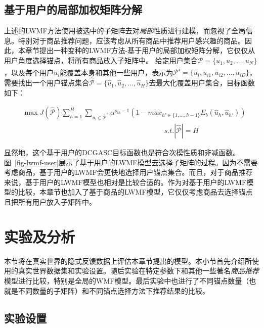 \subsection{基于用户的局部加权矩阵分解}
上述的LWMF方法使用被选中的子矩阵去对\textit{局部}性质进行建模，而忽视了全局信息。特别对于商品推荐问题，应该考虑从所有商品中推荐用户感兴趣的商品。因此，本章节提出一种变种的LWMF方法-基于用户的局部加权矩阵分解，它仅仅从用户角度选择锚点，将所有商品放入子矩阵中。 给定用户集合$\mathcal{P}=\{u_1,u_2,...,u_N\}$ ，以及每个用户$u_i$能覆盖本身和其他一些用户，表示为$\bar{\mathcal{P}^i}=\{u_i, u_{i1}, u_{i2},..., u_{iD}\}$，需要找出一个用户锚点集合$\mathcal{\hat{P}}=\{\hat{u}_1,\hat{u}_2,...,\hat{u}_H\}$去最大化覆盖用户集合，目标函数如下：

\begin{align}
&\max J(\mathcal{\hat{P}}) \sum_{h=1}^{H}\sum_{u_l \in \bar{\mathcal{P}}^h}\alpha^{o_{lh}-1}(1-max_{h'\in\{1,...,h-1\}} E_b(\hat{u}_h,\hat{u}_{h'})) \nonumber \\
&\qquad\qquad\qquad\qquad\qquad\qquad\qquad\qquad\qquad\qquad s.t. |\mathcal{\hat{P}}| = H
\end{align}

显然地，这个基于用户的DCGASC目标函数也是符合次模性质和非减函数。图~\ref{fig-lwmf-user}展示了基于用户的LWMF模型去选择子矩阵的过程。因为不需要考虑商品，基于用户的LWMF会更快地选择用户锚点集合。而且，对于商品推荐来说，基于用户的LWMF模型也相对是比较合适的。作为对基于用户的LWMF模型的比较，本章节也加入了基于商品的LWMF模型，它仅仅考虑商品去选择锚点且把所有用户放入子矩阵中。




\section{实验及分析}
\label{sec-lwmf-exp}

本节将在真实世界的隐式反馈数据上评估本章节提出的模型。本小节首先介绍所使用的真实世界数据集和实验设置。随后实验在特定参数下和其他一些著名\textit{商品推荐}模型进行比较，特别是全局的WMF模型。最后实验中也进行了不同锚点数量（也就是不同数量的子矩阵）和不同锚点选择方法下推荐结果的比较。

\subsection{实验设置}
